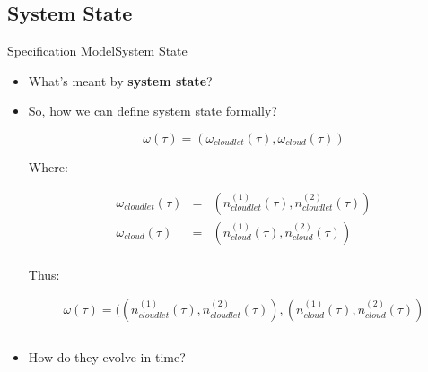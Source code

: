 \documentclass[10pt]{beamer}
\begin{document}
\subsection{System State}
\begin{frame}[fragile]{Specification Model}{System State}

\begin{itemize}
\item What's meant by \textbf{system state}?
\item So, how we can define system state formally?

\begin{equation}
\omega(\tau) = (\omega_{cloudlet}(\tau),\omega_{cloud}(\tau))
\end{equation}

Where:

\begin{equation}
\begin{array} {rcl} 
\omega_{cloudlet}(\tau) & = & (n_{cloudlet}^{(1)}(\tau),n_{cloudlet}^{(2)}(\tau)) \\
\omega_{cloud}(\tau) & = & (n_{cloud}^{(1)}(\tau),n_{cloud}^{(2)}(\tau)) \\
\end{array}
\end{equation}

Thus:

\begin{equation}
\begin{array} {rcl} 
\omega(\tau) = ((n_{cloudlet}^{(1)}(\tau),n_{cloudlet}^{(2)}(\tau)),(n_{cloud}^{(1)}(\tau),n_{cloud}^{(2)}(\tau))\\\\
\end{array}
\end{equation}

\item How do they evolve in time?
\end{itemize}

\end{frame}


\end{document}
